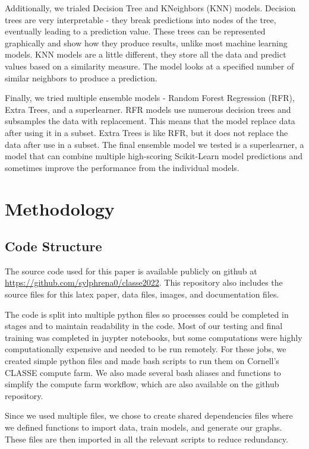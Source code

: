 \documentclass[twocolumn, nofootinbib, secnumarabic, amssymb, nobibnotes, aps, prd]{revtex4-2}
\begin{document}
Additionally, we trialed Decision Tree and KNeighbors (KNN) models. Decision trees are very interpretable - they break predictions into nodes of the tree, eventually leading to a prediction value. These trees can be represented graphically and show how they produce results, unlike most machine learning models. KNN models are a little different, they store all the data and predict values based on a similarity measure. The model looks at a specified number of similar neighbors to produce a prediction.

Finally, we tried multiple ensemble models - Random Forest Regression (RFR), Extra Trees, and a superlearner. RFR models use numerous decision trees and subsamples the data with replacement. This means that the model replace data after using it in a subset. Extra Trees is like RFR, but it does not replace the data after use in a subset. The final ensemble model we tested is a superlearner, a model that can combine multiple high-scoring Scikit-Learn model predictions and sometimes improve the performance from the individual models.


\section{Methodology}
\subsection{Code Structure}
The source code used for this paper is available publicly on github at \url{https://github.com/sylphrena0/classe2022}. This repository also includes the source files for this latex paper, data files, images, and documentation files.

The code is split into multiple python files so processes could be completed in stages and to maintain readability in the code. Most of our testing and final training was completed in juypter notebooks, but some computations were highly computationally expensive and needed to be run remotely. For these jobs, we created simple python files and made bash scripts to run them on Cornell's CLASSE compute farm. We also made several bash aliases and functions to simplify the compute farm workflow, which are also available on the github repository. 

Since we used multiple files, we chose to create shared dependencies files where we defined functions to import data, train models, and generate our graphs. These files are then imported in all the relevant scripts to reduce redundancy.
\end{document}
